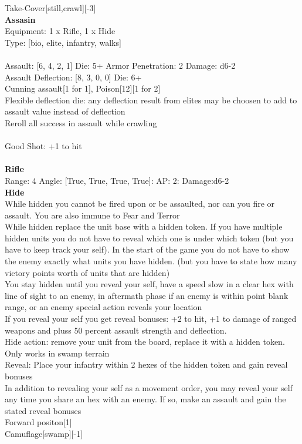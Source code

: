 \noindent Take-Cover[still,crawl][-3]\\ 


{\bf Assasin } \\
Equipment: 1 x Rifle, 1 x Hide \\
Type: [bio, elite, infantry, walks] \\
\ \\
Assault: [6, 4, 2, 1] Die: 5+ Armor Penetration: 2 Damage: d6-2 \\
Assault Deflection: [8, 3, 0, 0] Die: 6+\\
\indent Cunning assault[1 for 1], Poison[12][1 for 2]\\ 
Flexible deflection die: any deflection result from elites may be choosen to add to assault value instead of deflection\\ 
Reroll all success in assault while crawling\\ 
 
\ \\
Good Shot: +1 to hit\\ 

\ \\
{\bf Rifle } \\



Range: 4  Angle: [True, True, True, True]: AP: 2: Damage:d6-2 \\




{\bf Hide } \\

While hidden you cannot be fired upon or be assaulted, nor can you fire or assault. You are also immune to Fear and Terror\\ 
While hidden replace the unit base with a hidden token. If you have multiple hidden units you do not have to reveal which one is under which token (but you have to keep track your self). In the start of the game you do not have to show the enemy exactly what units you have hidden. (but you have to state how many victory points worth of units that are hidden)\\ 
You stay hidden until you reveal your self, have a speed slow in a clear hex with line of sight to an enemy, in aftermath phase if an enemy is within point blank range, or an enemy special action reveals your location\\ 
If you reveal your self you get reveal bonuses: +2 to hit, +1 to damage of ranged weapons and pluss 50 percent assault strength and deflection.\\ 
Hide action: remove your unit from the board, replace it with a hidden token. Only works in swamp terrain\\ 
Reveal: Place your infantry within 2 hexes of the hidden token and gain reveal bonuses\\ 
In addition to revealing your self as a movement order, you may reveal your self any time you share an hex with an enemy. If so, make an assault and gain the stated reveal bonuses\\ 
Forward positon[1]\\ 
Camuflage[swamp][-1]\\ 





